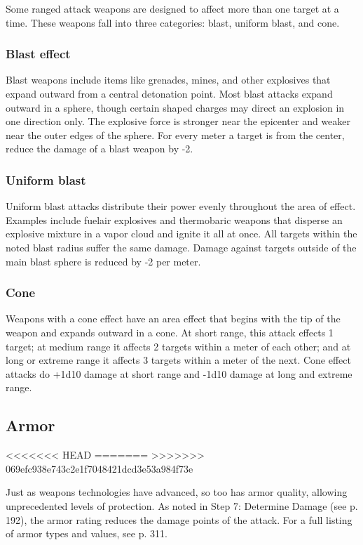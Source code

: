 Some ranged attack weapons are designed to affect more than one target at a time. These weapons fall into three categories: blast, uniform blast, and cone. 

\subsubsection{Blast effect} 

Blast weapons include items like grenades, mines, and other explosives that expand outward from a central detonation point. Most blast attacks expand outward in a sphere, though certain shaped charges may direct an explosion in one direction only. The explosive force is stronger near the epicenter and weaker near the outer edges of the sphere. For every meter a target is from the center, reduce the damage of a blast weapon by -2. 

\subsubsection{Uniform blast} 

Uniform blast attacks distribute their power evenly throughout the area of effect. Examples include fuelair explosives and thermobaric weapons that disperse an explosive mixture in a vapor cloud and ignite it all at once. All targets within the noted blast radius suffer the same damage. Damage against targets outside of the main blast sphere is reduced by -2 per meter. 

\subsubsection{Cone} 

Weapons with a cone effect have an area effect that begins with the tip of the weapon and expands outward in a cone. At short range, this attack effects 1 target; at medium range it affects 2 targets within a meter of each other; and at long or extreme range it affects 3 targets within a meter of the next. Cone effect attacks do +1d10 damage at short range and -1d10 damage at long and extreme range. 



\subsection{Armor} <<<<<<< HEAD \label{sec:armor} ======= \label{sec:combat-armor} >>>>>>> 069efc938e743c2e1f7048421dcd3e53a984f73e 

Just as weapons technologies have advanced, so too has armor quality, allowing unprecedented levels of protection. As noted in Step 7: Determine Damage (see p. 192), the armor rating reduces the damage points of the attack. For a full listing of armor types and values, see p. 311. 

